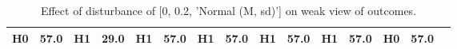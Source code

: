 \begin{table}
\begin{tabular}{l|cc|cc|cc|cc|cc|cc|cc}
\cellcolor{Bittersweet}H0&\cellcolor{Bittersweet}57.0&\cellcolor{Bittersweet}H1&\cellcolor{Bittersweet}29.0&\cellcolor{Bittersweet}H1&\cellcolor{Bittersweet}57.0&\cellcolor{Bittersweet}H1&\cellcolor{Bittersweet}57.0&\cellcolor{Bittersweet}H1&\cellcolor{Bittersweet}57.0&\cellcolor{Bittersweet}H1&\cellcolor{Bittersweet}57.0&\cellcolor{Bittersweet}H0&\cellcolor{Bittersweet}57.0\\\bottomrule\end{tabular}\caption{Effect of disturbance of [0, 0.2, 'Normal (M, sd)'] on weak view of outcomes.}\end{table}
